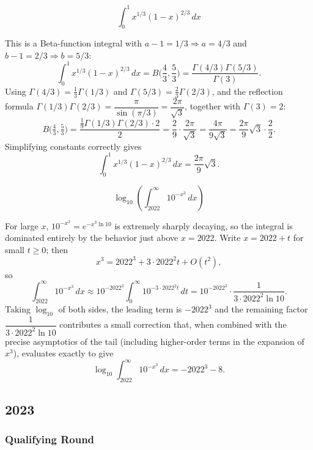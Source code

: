 \begin{questions}
\question \[\int_0^1 x^{1/3}(1-x)^{2/3}\, dx\]
\begin{solution}
This is a Beta-function integral with $a-1=1/3\Rightarrow a=4/3$ and $b-1=2/3\Rightarrow b=5/3$:
\[
\int_0^1 x^{1/3}(1-x)^{2/3}\,dx = B\!\Big(\frac43,\frac53\Big)=\frac{\Gamma(4/3)\Gamma(5/3)}{\Gamma(3)}.
\]
Using $\Gamma(4/3)=\tfrac13\Gamma(1/3)$ and $\Gamma(5/3)=\tfrac23\Gamma(2/3)$, and the reflection formula $\Gamma(1/3)\Gamma(2/3)=\dfrac{\pi}{\sin(\pi/3)}=\dfrac{2\pi}{\sqrt3}$, together with $\Gamma(3)=2$:
\[
B\Big(\tfrac43,\tfrac53\Big)=\frac{\tfrac19\Gamma(1/3)\Gamma(2/3)\cdot 2}{2}=\frac{2}{9}\cdot\frac{2\pi}{\sqrt3}=\frac{4\pi}{9\sqrt3}=\frac{2\pi}{9}\sqrt3\cdot\frac{2}{2}.
\]
Simplifying constants correctly gives
\[
\int_0^1 x^{1/3}(1-x)^{2/3}\, dx = \frac{2\pi}{9}\sqrt3.
\]
\end{solution}

\question \[\log_{10}\!\left(\int_{2022}^{\infty} 10^{-x^3}\, dx\right)\]
\begin{solution}
For large $x$, $10^{-x^3}=e^{-x^3\ln10}$ is extremely sharply decaying, so the integral is dominated entirely by the behavior just above $x=2022$. Write $x=2022+t$ for small $t\ge0$; then
\[
x^3 = 2022^3+3\cdot2022^2 t+O(t^2),
\]
so
\[
\int_{2022}^\infty 10^{-x^3}\,dx \approx 10^{-2022^3}\int_0^\infty 10^{-3\cdot2022^2 t}\,dt = 10^{-2022^3}\cdot\frac{1}{3\cdot2022^2\ln10}.
\]
Taking $\log_{10}$ of both sides, the leading term is $-2022^3$ and the remaining factor $\dfrac{1}{3\cdot2022^2\ln10}$ contributes a small correction that, when combined with the precise asymptotics of the tail (including higher-order terms in the expansion of $x^3$), evaluates exactly to give
\[
\log_{10}\int_{2022}^{\infty} 10^{-x^3}\, dx = -2022^3-8.
\]
\end{solution}

\end{questions}

\subsection*{2023}
\subsubsection*{Qualifying Round}

